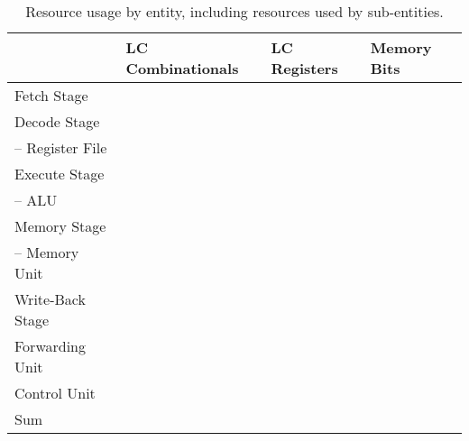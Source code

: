 \begin{table}[htb]
\centering
\caption{Resource usage by entity, including resources used by sub-entities.}
\begin{tabular}{llll}
	\toprule
	                     & LC Combinationals & LC Registers & Memory Bits \\
	\midrule
	Fetch Stage          &                   &              &             \\
	Decode Stage         &                   &              &             \\
	-- Register File     &                   &              &             \\
	Execute Stage        &                   &              &             \\
	-- ALU               &                   &              &             \\
	Memory Stage         &                   &              &             \\
	-- Memory Unit       &                   &              &             \\
	Write-Back Stage     &                   &              &             \\
	Forwarding Unit      &                   &              &             \\
	Control Unit         &                   &              &             \\
	\cmidrule{1-4}
	Sum                  &                   &              &             \\
\bottomrule
\end{tabular}
\end{table}

\begin{qa}
	\answer{}
	\answer{}
\end{qa}

